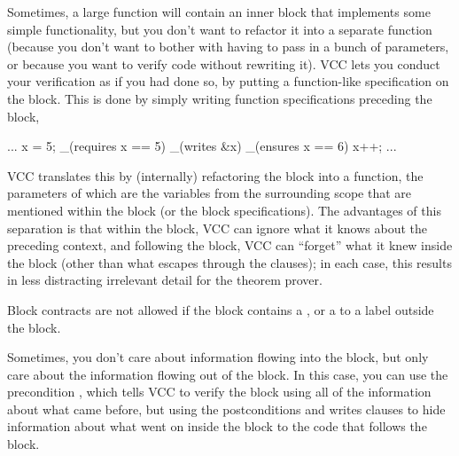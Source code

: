 Sometimes, a large function will contain an inner block that
implements some simple functionality, but you don't want to refactor
it into a separate function (\eg because you don't want to bother with
having to pass in a bunch of parameters, or because you want to verify
code without rewriting it). VCC lets you conduct your verification as
if you had done so, by putting a function-like specification on the
block.
This is done by simply writing function specifications
preceding the block, \eg
\begin{VCC}
...
x = 5;
_(requires x == 5)
_(writes &x)
_(ensures x == 6)
{
  x++;
}
...
\end{VCC}
VCC translates this by (internally) refactoring the block into a
function, the parameters of which are the variables from the
surrounding scope that are mentioned within the block (or the block
specifications). The advantages of this separation is that within the block,
VCC can ignore what it knows about the preceding context, and
following the block, VCC can ``forget'' what it knew inside the block
(other than what escapes through the  clauses); in each
case, this results in less distracting irrelevant detail for the
theorem prover.

Block contracts are not allowed if the block contains a ,
or a  to a label outside the block.

Sometimes, you don't care about information flowing into the block,
but only care about the information flowing out of the block. In this
case, you can use the precondition ,
which tells VCC to verify the block using all of the information about
what came before, but using the postconditions and writes clauses to
hide information about what went on inside the block to the code that
follows the block.





